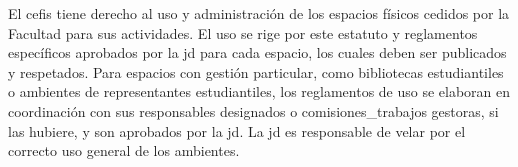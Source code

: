 \documentclass[11pt]{article}
\begin{document}
\begin{artitems}
\end{artitems}

El \gls{cefis} tiene derecho al uso y administración de los espacios físicos cedidos por la Facultad para sus actividades. El uso se rige por este \gls{estatuto} y reglamentos específicos aprobados por la \gls{jd} para cada espacio, los cuales deben ser publicados y respetados. Para espacios con gestión particular, como bibliotecas estudiantiles o ambientes de representantes estudiantiles, los reglamentos de uso se elaboran en coordinación con sus responsables designados o \glspl{comisiones_trabajo} gestoras, si las hubiere, y son aprobados por la \gls{jd}. La \gls{jd} es responsable de velar por el correcto uso general de los ambientes.
\end{document}
